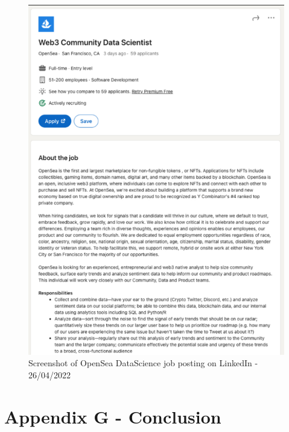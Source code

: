 \begin{figure}[h!]
\centering
\includegraphics[width=\textwidth]{images/appendix/opensea-datascientist-jobposting.png}
\caption{Screenshot of OpenSea DataScience job posting on LinkedIn - 26/04/2022}
\label{fig:appendix:self-eval}
\end{figure}

\chapter{Appendix G - Conclusion}
\label{appendix:conclusion}

